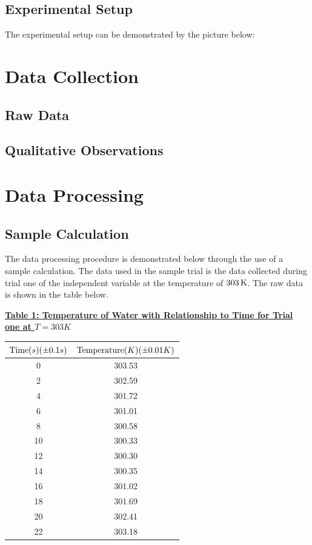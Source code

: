 \documentclass{article}
\begin{document}
\subsection{Experimental Setup}
The experimental setup can be demonstrated by the picture below:

\section{Data Collection}
\subsection{Raw Data}


\subsection{Qualitative Observations}

\section{Data Processing}
\subsection{Sample Calculation}
The data processing procedure is demonstrated below through the use of a sample calculation. The data used in the sample trial is the data collected during trial one of the independent variable at the temperature of $\ce{303K}$. The raw data is shown in the table below.

\textbf{\underline{Table 1: Temperature of Water with Relationship to Time for Trial one at $T = 303K$}}
\begin{doublespace}
\begin{center}
\begin{tabular}{ |c|c| } 
 \hline
 $\ce{Time}(s)(\pm 0.1s)$ & $\ce{Temperature}(K)(\pm 0.01K)$  \\ 
 \hline
 0 & 303.53  \\ 
 2 & 302.59  \\ 
 4 & 301.72 \\
 6 & 301.01 \\
 8 & 300.58 \\
 10 & 300.33 \\
 12 & 300.30 \\
 14 & 300.35 \\
 16 & 301.02 \\
 18 & 301.69 \\
 20 & 302.41 \\ 
 22 & 303.18 \\
 \hline
\end{tabular}
\end{center}
\end{doublespace}
\end{document}
